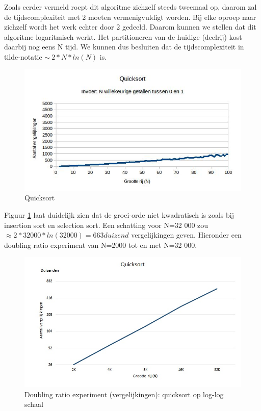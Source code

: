 \documentclass{article}
\begin{document}
Zoals eerder vermeld roept dit algoritme zichzelf steeds tweemaal op, daarom zal de tijdscomplexiteit met 2 moeten vermenigvuldigt worden. Bij elke oproep naar zichzelf wordt het werk echter door 2 gedeeld. Daarom kunnen we stellen dat dit algoritme logaritmisch werkt. Het partitioneren van de huidige (deelrij) kost daarbij nog eens N tijd. We kunnen dus besluiten dat de tijdscomplexiteit in tilde-notatie $\sim\ 2*N*ln(N)$ is.

\begin{figure}[h!]
\centering
\includegraphics[scale=0.55]{quicksort_1-100.jpg}
\caption{Quicksort}
\label{fig:Quicksort_1-100}
\end{figure}

Figuur \ref{fig:Quicksort_1-100} laat duidelijk zien dat de groei-orde niet kwadratisch is zoals bij insertion sort en selection sort.
\newpage
Een schatting voor N=32 000 zou $\approx 2 * 32 000 * ln(32 000) = 663 duizend $ vergelijkingen geven. Hieronder een doubling ratio experiment van N=2000 tot en met N=32 000.

\begin{figure}[h!]
\centering
\includegraphics[scale=0.8]{quicksort.jpg}
\caption{Doubling ratio experiment (vergelijkingen): quicksort op log-log schaal}
\label{fig:Quicksort_doubling}
\end{figure}
\end{document}
